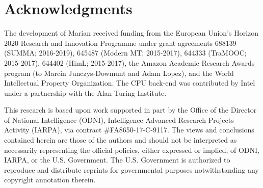 \documentclass[11pt,a4paper]{article}
\begin{document}
  \section*{Acknowledgments}

  {\small The development of Marian received funding from the European Union's Horizon 2020 Research and Innovation Programme under grant agreements 688139 (SUMMA; 2016-2019), 645487 (Modern MT; 2015-2017), 644333 (TraMOOC; 2015-2017), 644402 (HimL; 2015-2017), the Amazon Academic Research Awards program (to Marcin Jun\-czys-Dow\-munt and Adam Lopez), and the World Intellectual Property Organization. The CPU back-end was contributed by Intel under a partnership with the Alan Turing Institute. 

   This research is based upon work supported in part by the Office of the Director of National Intelligence (ODNI), Intelligence Advanced Research Projects Activity (IARPA), via contract \#FA8650-17-C-9117. The views and conclusions contained herein are those of the authors and should not be interpreted as necessarily representing the official policies, either expressed or implied, of ODNI, IARPA, or the U.S. Government. The U.S. Government is authorized to reproduce and distribute reprints for governmental purposes notwithstanding any copyright annotation therein.\par}

  
  
  
\end{document}
